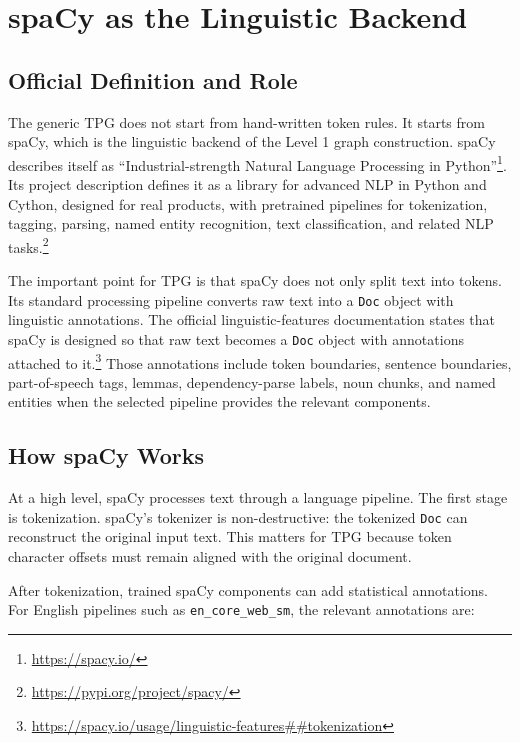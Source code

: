 \documentclass[11pt]{article}
\begin{document}
\section{spaCy as the Linguistic Backend}

\subsection{Official Definition and Role}

The generic TPG does not start from hand-written token rules. It starts from
spaCy, which is the linguistic backend of the Level 1 graph construction.
spaCy describes itself as ``Industrial-strength Natural Language Processing in
Python''\footnote{\url{https://spacy.io/}}. Its project description defines it
as a library for advanced NLP in Python and Cython, designed for real products,
with pretrained pipelines for tokenization, tagging, parsing, named entity
recognition, text classification, and related NLP tasks.\footnote{\url{https://pypi.org/project/spacy/}}

The important point for TPG is that spaCy does not only split text into tokens.
Its standard processing pipeline converts raw text into a \texttt{Doc} object
with linguistic annotations. The official linguistic-features documentation
states that spaCy is designed so that raw text becomes a \texttt{Doc} object
with annotations attached to it.\footnote{\url{https://spacy.io/usage/linguistic-features\#\#tokenization}}
Those annotations include token boundaries, sentence boundaries,
part-of-speech tags, lemmas, dependency-parse labels, noun chunks, and named
entities when the selected pipeline provides the relevant components.

\subsection{How spaCy Works}

At a high level, spaCy processes text through a language pipeline. The first
stage is tokenization. spaCy's tokenizer is non-destructive: the tokenized
\texttt{Doc} can reconstruct the original input text. This matters for TPG
because token character offsets must remain aligned with the original document.

After tokenization, trained spaCy components can add statistical annotations.
For English pipelines such as \texttt{en\_core\_web\_sm}, the relevant
annotations are:
\end{document}
